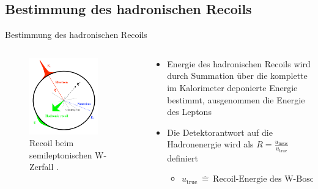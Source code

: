 \documentclass[aspectratio=1610, 9pt]{beamer}
\begin{document}
\subsection{Bestimmung des hadronischen Recoils}

\begin{frame}{Bestimmung des hadronischen Recoils}
  \begin{columns}
    \begin{column}{0.4\textwidth}
      \begin{figure}
        \includegraphics[width=0.8\textwidth]{images/w-recoil.png}
        \caption{Recoil beim semileptonischen W-Zerfall \cite{recoil}.}
      \end{figure}
    \end{column}
    \begin{column}{0.4\textwidth}
      \begin{itemize}
        \item Energie des hadronischen Recoils wird durch Summation über die komplette im Kalorimeter deponierte Energie bestimmt, ausgenommen die Energie des Leptons
        \item Die Detektorantwort auf die Hadronenergie wird als $R = \frac{u_\text{meas}}{u_\text{true}}$ definiert
        \begin{itemize}
          \item[\rightarrow] $u_\text{true} \: \hat{=} \: \text{Recoil-Energie des W-Bosons}$
        \end{itemize}
      \end{itemize}
    \end{column}
  \end{columns}



\end{frame}
\end{document}
